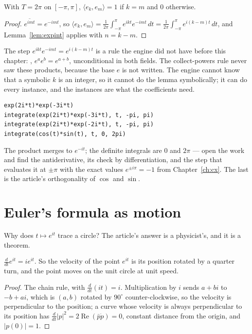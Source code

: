 \begin{theorem}[Orthonormality]\label{thm:ortho}
  With $T = 2\pi$ on $[-\pi, \pi]$, $\langle e_k, e_m\rangle = 1$ if $k = m$ and $0$ otherwise.
\end{theorem}
\begin{proof}
  $\overline{e^{imt}} = e^{-imt}$, so $\langle e_k, e_m\rangle = \frac{1}{2\pi}\int_{-\pi}^{\pi}
  e^{ikt}e^{-imt}\,dt = \frac{1}{2\pi}\int_{-\pi}^{\pi} e^{i(k-m)t}\,dt$, and
  Lemma~\ref{lem:expint} applies with $n = k - m$.
\end{proof}

The step $e^{ikt}e^{-imt} = e^{i(k-m)t}$ is a rule the engine did not have before this chapter:
, $e^a e^b = e^{a+b}$, unconditional in both fields. The collect-powers
rule never saw these products, because the base $e$ is not written. The engine cannot know that a
symbolic $k$ is an integer, so it cannot do the lemma symbolically; it can do every instance, and
the instances are what the coefficients need.

\begin{trybox}
\begin{verbatim}
exp(2i*t)*exp(-3i*t)
integrate(exp(2i*t)*exp(-3i*t), t, -pi, pi)
integrate(exp(2i*t)*exp(-2i*t), t, -pi, pi)
integrate(cos(t)*sin(t), t, 0, 2pi)
\end{verbatim}
  The product merges to $e^{-it}$; the definite integrals are $0$ and $2\pi$ --- open the work
  and find the antiderivative, its check by differentiation, and the  step that
  evaluates it at $\pm\pi$ with the exact values $e^{\pm i\pi} = -1$ from Chapter~\ref{ch:cx}.
  The last is the article's orthogonality of $\cos$ and $\sin$.
\end{trybox}

\section{Euler's formula as motion}

Why does $t \mapsto e^{it}$ trace a circle? The article's answer is a physicist's, and it is a
theorem.

\begin{proposition}
  $\frac{d}{dt} e^{it} = i e^{it}$. So the velocity of the point $e^{it}$ is its position rotated
  by a quarter turn, and the point moves on the unit circle at unit speed.
\end{proposition}
\begin{proof}
  The chain rule, with $\frac{d}{dt}(it) = i$. Multiplication by $i$ sends $a + bi$ to $-b + ai$,
  which is $(a, b)$ rotated by $90^\circ$ counter-clockwise, so the velocity is perpendicular to
  the position; a curve whose velocity is always perpendicular to its position has $\frac{d}{dt}|p|^2
  = 2\operatorname{Re}(\bar p \dot p) = 0$, constant distance from the origin, and $|p(0)| = 1$.
\end{proof}

